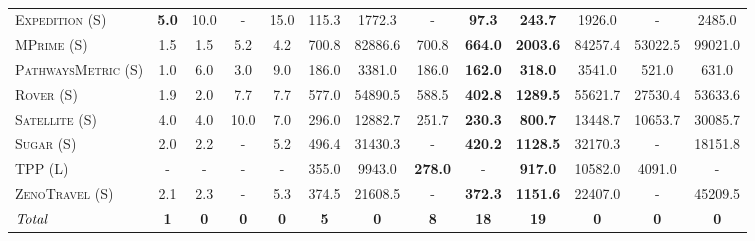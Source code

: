 \documentclass[11pt,landscape]{article}
\begin{document}
\begin{table}[tb]
{\begin{tabular}{|l||cccc||cccc||cccc||}
\textsc{Expedition} (S)&\textbf{5.0}&10.0&-&15.0&115.3&1772.3&-&\textbf{97.3}&\textbf{243.7}&1926.0&-&2485.0\\
\textsc{MPrime} (S)&1.5&1.5&5.2&4.2&700.8&82886.6&700.8&\textbf{664.0}&\textbf{2003.6}&84257.4&53022.5&99021.0\\
\textsc{PathwaysMetric} (S)&1.0&6.0&3.0&9.0&186.0&3381.0&186.0&\textbf{162.0}&\textbf{318.0}&3541.0&521.0&631.0\\
\textsc{Rover} (S)&1.9&2.0&7.7&7.7&577.0&54890.5&588.5&\textbf{402.8}&\textbf{1289.5}&55621.7&27530.4&53633.6\\
\textsc{Satellite} (S)&4.0&4.0&10.0&7.0&296.0&12882.7&251.7&\textbf{230.3}&\textbf{800.7}&13448.7&10653.7&30085.7\\
\textsc{Sugar} (S)&2.0&2.2&-&5.2&496.4&31430.3&-&\textbf{420.2}&\textbf{1128.5}&32170.3&-&18151.8\\
\textsc{TPP} (L)&-&-&-&-&355.0&9943.0&\textbf{278.0}&-&\textbf{917.0}&10582.0&4091.0&-\\
\textsc{ZenoTravel} (S)&2.1&2.3&-&5.3&374.5&21608.5&-&\textbf{372.3}&\textbf{1151.6}&22407.0&-&45209.5
\\\hline
$\emph{Total}$&\textbf{1}&\textbf{0}&\textbf{0}&\textbf{0}&\textbf{5}&\textbf{0}&\textbf{8}&\textbf{18}&\textbf{19}&\textbf{0}&\textbf{0}&\textbf{0}\\\hline

        \end{tabular}}
        \caption{}
        \label{tab:experiments-smt}
        \end{table}
        
\end{document}
